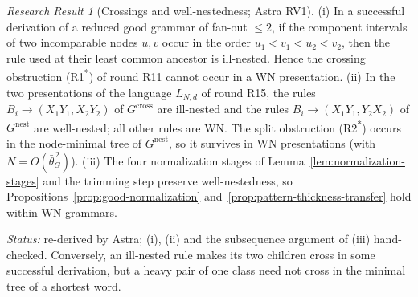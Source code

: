 \documentclass[11pt]{article}
\numberwithin{equation}{section}
\theoremstyle{plain}
\theoremstyle{definition}
\theoremstyle{remark}
\newtheorem{rresult}[theorem]{Research Result}
\theoremstyle{plain}
\begin{document}
\begin{rresult}[Crossings and well-nestedness; Astra RV1]
\label{rr:RV1-crossing}
(i) In a successful derivation of a reduced good grammar of fan-out $\le2$, if the component
intervals of two incomparable nodes $u,v$ occur in the order $u_1<v_1<u_2<v_2$, then the rule
used at their least common ancestor is ill-nested.  Hence the crossing obstruction (R1\textsuperscript{*})
of round R11 cannot occur in a WN presentation.  (ii) In the two presentations of the language
$L_{N,d}$ of round R15, the rules $B_i\to(X_1Y_1,X_2Y_2)$ of $G^{\mathrm{cross}}$ are ill-nested and
the rules $B_i\to(X_1Y_1,Y_2X_2)$ of $G^{\mathrm{nest}}$ are well-nested; all other rules are WN.
The split obstruction (R2\textsuperscript{*}) occurs in the node-minimal tree of
$G^{\mathrm{nest}}$, so it survives in WN presentations (with $N=O(\bar\theta_G^{\,2})$).
(iii) The four normalization stages of Lemma~\ref{lem:normalization-stages} and the trimming step
preserve well-nestedness, so Propositions~\ref{prop:good-normalization}
and~\ref{prop:pattern-thickness-transfer} hold within WN grammars.
\end{rresult}
\noindent\emph{Status:} re-derived by Astra; (i), (ii) and the subsequence argument of (iii)
hand-checked.  Conversely, an ill-nested rule makes its two children cross in some successful
derivation, but a heavy pair of one class need not cross in the minimal tree of a shortest word.
\end{document}
